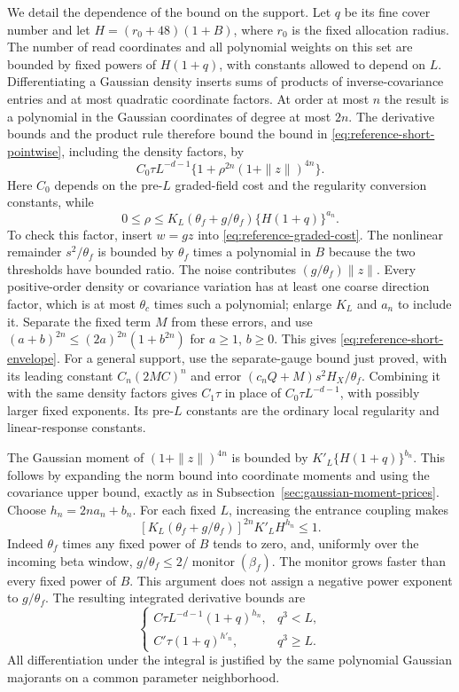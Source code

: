 We detail the dependence of the bound on the support. Let $q$
be its fine cover number and let
$H=(r_0+48)(1+B)$, where $r_0$ is the fixed allocation radius.
The number of read coordinates and all polynomial weights on
this set are bounded by fixed powers of $H(1+q)$, with constants
allowed to depend on $L$. Differentiating a Gaussian density
inserts sums of products of inverse-covariance entries and at
most quadratic coordinate factors. At order at most $n$ the
result is a polynomial in the Gaussian coordinates of degree
at most $2n$. The derivative bounds and the product rule therefore
bound the bound in \eqref{eq:reference-short-pointwise}, including
the density factors, by
\begin{equation}\label{eq:reference-short-envelope}
 C_0\tau L^{-d-1}
        \{1+\rho^{2n}(1+\|z\|)^{4n}\}.
\end{equation}
Here $C_0$ depends on the pre-$L$ graded-field cost and the
regularity conversion constants, while
\[
 0\le\rho\le K_L(\theta_f+g/\theta_f)
                         \{H(1+q)\}^{a_n}.
\]
To check this factor, insert $w=gz$ into
\eqref{eq:reference-graded-cost}. The nonlinear remainder
$s^2/\theta_f$ is bounded by $\theta_f$ times a polynomial in
$B$ because the two thresholds have bounded ratio. The noise
contributes $(g/\theta_f)\|z\|$. Every positive-order density
or covariance variation has at least one coarse direction factor,
which is at most $\theta_c$ times such a polynomial; enlarge
$K_L$ and $a_n$ to include it. Separate the fixed term $M$ from
these errors, and use
$(a+b)^{2n}\le(2a)^{2n}(1+b^{2n})$ for $a\ge1$, $b\ge0$.
This gives \eqref{eq:reference-short-envelope}. For a general support,
use the separate-gauge bound just proved, with its leading constant
$C_n(2MC)^n$ and error $(c_nQ+M)s^2H_X/\theta_f$.
Combining it with the same density factors gives $C_1\tau$ in
place of $C_0\tau L^{-d-1}$, with possibly larger fixed exponents.
Its pre-$L$ constants are the ordinary local regularity and
linear-response constants.

The Gaussian moment of $(1+\|z\|)^{4n}$ is bounded by
$K'_L\{H(1+q)\}^{b_n}$. This follows by expanding the norm
bound into coordinate moments and using the covariance upper
bound, exactly as in Subsection~\ref{sec:gaussian-moment-prices}.
Choose $h_n=2na_n+b_n$. For each fixed $L$, increasing the
entrance coupling makes
\[
 [K_L(\theta_f+g/\theta_f)]^{2n}K'_L H^{h_n}\le1.
\]
Indeed $\theta_f$ times any fixed power of $B$ tends to zero,
and, uniformly over the incoming beta window,
$g/\theta_f\le2/\operatorname{monitor}(\beta_f)$.
The monitor grows faster than every fixed power of $B$.
This argument does not assign a negative power exponent to
$g/\theta_f$. The resulting integrated derivative bounds are
\begin{equation}\label{eq:reference-integrated-attenuation}
 \begin{cases}
 C\tau L^{-d-1}(1+q)^{h_n},&q^3<L,\\
 C'\tau(1+q)^{h'_n},&q^3\ge L.
 \end{cases}
\end{equation}
All differentiation under the integral is justified by the same
polynomial Gaussian majorants on a common parameter neighborhood.

